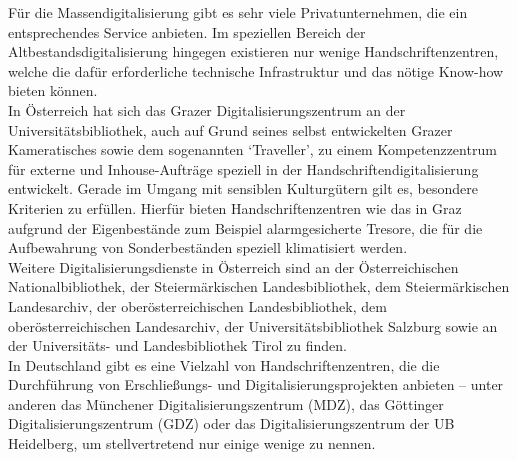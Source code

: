 \documentclass{article}
\begin{document}
    Für die Massendigitalisierung gibt es sehr viele Privatunternehmen, die ein entsprechendes Service anbieten. Im speziellen Bereich der Altbestandsdigitalisierung hingegen existieren nur wenige Handschriftenzentren, welche die dafür erforderliche technische Infrastruktur und das nötige Know-how bieten können. \\
            
        In Österreich hat sich das Grazer Digitalisierungszentrum an der Universitätsbibliothek, auch auf Grund seines selbst entwickelten Grazer Kameratisches sowie dem sogenannten ‘Traveller’, zu einem Kompetenzzentrum für externe und Inhouse-Aufträge speziell in der Handschriftendigitalisierung entwickelt. Gerade im Umgang mit sensiblen Kulturgütern gilt es, besondere Kriterien zu erfüllen. Hierfür bieten Handschriftenzentren wie das in Graz aufgrund der Eigenbestände zum Beispiel alarmgesicherte Tresore, die für die Aufbewahrung von Sonderbeständen speziell klimatisiert werden.   \\
            
        Weitere Digitalisierungsdienste in Österreich sind an der Österreichischen Nationalbibliothek, der Steiermärkischen Landesbibliothek, dem Steiermärkischen Landesarchiv, der oberösterreichischen Landesbibliothek, dem oberösterreichischen Landesarchiv, der Universitätsbibliothek Salzburg sowie an der Universitäts- und Landesbibliothek Tirol zu finden.\\
            
        In Deutschland gibt es eine Vielzahl von Handschriftenzentren, die die Durchführung von Erschließungs- und Digitalisierungsprojekten anbieten – unter anderen das Münchener Digitalisierungszentrum (MDZ), das Göttinger Digitalisierungszentrum (GDZ) oder das Digitalisierungszentrum der UB Heidelberg, um stellvertretend nur einige wenige zu nennen.\\
            
\end{document}

